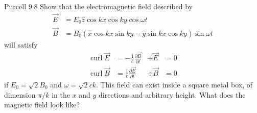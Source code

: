 \documentclass[makesolutionspdf]{esg8022pset}
\DeclareMathOperator{\curl}{curl}
\begin{document}
\begin{problem}{Purcell 9.8}
  Show that the electromagnetic field described by
  \begin{align*}
    \vec E & = E_0 \hat z \cos kx \cos ky \cos \omega t \\
    \vec B & = B_0(\hat x \cos kx \sin ky - \hat y \sin kx \cos ky) \sin \omega t
  \end{align*}
  will satisfy
  \begin{align*}
    \curl \vec E & = -\frac{1}{c}\frac{\partial \vec B}{\partial t} &
      \div\vec E & = 0 \\
    \curl \vec B & = \frac{1}{c}\frac{\partial \vec E}{\partial t} &
      \div\vec B & = 0
  \end{align*}
  if $E_0 = \sqrt{2}B_0$ and $\omega = \sqrt{2}ck$. This field can exist
  inside a square metal box, of dimension $\pi / k$ in the $x$ and $y$ directions
  and arbitrary height. What does the magnetic field look like?
\end{problem}
\end{document}
